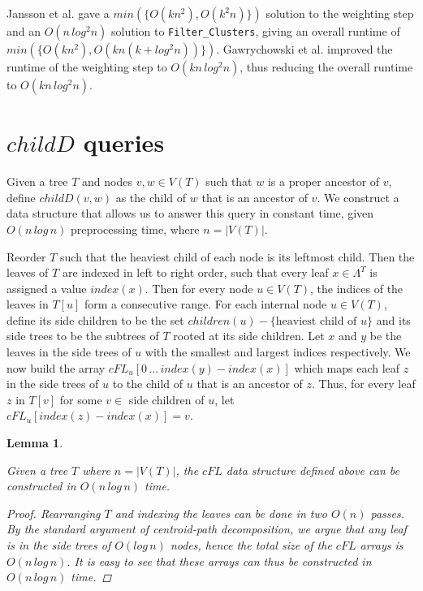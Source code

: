 \documentclass{article}
\newcommand{\leafset}{\Lambda}
\newtheorem{cfddatastructure}[incompatibility]{Lemma}
\begin{document}
    Jansson et al. \cite{jansson2018algorithms} gave a $min(\{O(kn^2), O(k^2n)\})$ solution to the weighting step and an $O(n\,log^2n)$ solution to \texttt{Filter\_Clusters}, giving an overall runtime of $min(\{O(kn^2), O(kn(k + log^2n))\})$. Gawrychowski et al. \cite{gawrychowski2017faster} improved the runtime of the weighting step to $O(kn\,log^2n)$, thus reducing the overall runtime to $O(kn\,log^2n)$.

    \section{$childD$ queries}
    \label{sec:cfd}

    Given a tree $T$ and nodes $v, w \in V(T)$ such that $w$ is a proper ancestor of $v$, define $childD(v, w)$ as the child of $w$ that is an ancestor of $v$. We construct a data structure that allows us to answer this query in constant time, given $O(n\,log\,n)$ preprocessing time, where $n = |V(T)|$.

    Reorder $T$ such that the heaviest child of each node is its leftmost child. Then the leaves of $T$ are indexed in left to right order, such that every leaf $x \in \leafset^T$ is assigned a value $index(x)$. Then for every node $u \in V(T)$, the indices of the leaves in $T[u]$ form a consecutive range. For each internal node $u \in V(T)$, define its side children to be the set $children(u) - \{\text{heaviest child of }u\}$ and its side trees to be the subtrees of $T$ rooted at its side children. Let $x$ and $y$ be the leaves in the side trees of $u$ with the smallest and largest indices respectively. We now build the array $cFL_u[0\, ...\, index(y) - index(x)]$ which maps each leaf $z$ in the side trees of $u$ to the child of $u$ that is an ancestor of $z$. Thus, for every leaf $z$ in $T[v]$ for some $v \in$ side children of $u$, let $cFL_u[index(z) - index(x)] = v$.
    \newline

    \begin{cfddatastructure}
        \label{lem:cfddatastructure}

        Given a tree $T$ where $n = |V(T)|$, the $cFL$ data structure defined above can be constructed in $O(n\,log\,n)$ time.

        \begin{proof}
            Rearranging $T$ and indexing the leaves can be done in two $O(n)$ passes. By the standard argument of centroid-path decomposition, we argue that any leaf is in the side trees of $O(log\,n)$ nodes, hence the total size of the $cFL$ arrays is $O(n\,log\,n)$. It is easy to see that these arrays can thus be constructed in $O(n\,log\,n)$ time.
        \end{proof}
    \end{cfddatastructure}
\end{document}
